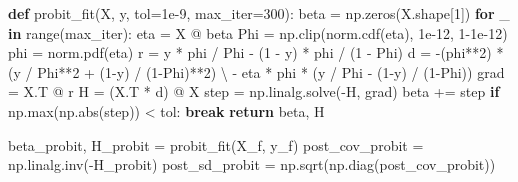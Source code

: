 \documentclass[
  letterpaper,
  DIV=11,
  numbers=noendperiod]{scrartcl}
\newenvironment{Shaded}{\begin{snugshade}}{\end{snugshade}}
\newcommand{\BuiltInTok}[1]{\textcolor[rgb]{0.00,0.23,0.31}{#1}}
\newcommand{\ControlFlowTok}[1]{\textcolor[rgb]{0.00,0.23,0.31}{\textbf{#1}}}
\newcommand{\DecValTok}[1]{\textcolor[rgb]{0.68,0.00,0.00}{#1}}
\newcommand{\FloatTok}[1]{\textcolor[rgb]{0.68,0.00,0.00}{#1}}
\newcommand{\KeywordTok}[1]{\textcolor[rgb]{0.00,0.23,0.31}{\textbf{#1}}}
\newcommand{\NormalTok}[1]{\textcolor[rgb]{0.00,0.23,0.31}{#1}}
\newcommand{\OperatorTok}[1]{\textcolor[rgb]{0.37,0.37,0.37}{#1}}
\begin{document}
\begin{Shaded}
\begin{Highlighting}[]
\KeywordTok{def}\NormalTok{ probit\_fit(X, y, tol}\OperatorTok{=}\FloatTok{1e{-}9}\NormalTok{, max\_iter}\OperatorTok{=}\DecValTok{300}\NormalTok{):}
\NormalTok{    beta }\OperatorTok{=}\NormalTok{ np.zeros(X.shape[}\DecValTok{1}\NormalTok{])}
    \ControlFlowTok{for}\NormalTok{ \_ }\KeywordTok{in} \BuiltInTok{range}\NormalTok{(max\_iter):}
\NormalTok{        eta }\OperatorTok{=}\NormalTok{ X }\OperatorTok{@}\NormalTok{ beta}
\NormalTok{        Phi }\OperatorTok{=}\NormalTok{ np.clip(norm.cdf(eta), }\FloatTok{1e{-}12}\NormalTok{, }\DecValTok{1}\OperatorTok{{-}}\FloatTok{1e{-}12}\NormalTok{)}
\NormalTok{        phi }\OperatorTok{=}\NormalTok{ norm.pdf(eta)}
\NormalTok{        r }\OperatorTok{=}\NormalTok{ y }\OperatorTok{*}\NormalTok{ phi }\OperatorTok{/}\NormalTok{ Phi }\OperatorTok{{-}}\NormalTok{ (}\DecValTok{1} \OperatorTok{{-}}\NormalTok{ y) }\OperatorTok{*}\NormalTok{ phi }\OperatorTok{/}\NormalTok{ (}\DecValTok{1} \OperatorTok{{-}}\NormalTok{ Phi)}
\NormalTok{        d }\OperatorTok{=} \OperatorTok{{-}}\NormalTok{(phi}\OperatorTok{**}\DecValTok{2}\NormalTok{) }\OperatorTok{*}\NormalTok{ (y }\OperatorTok{/}\NormalTok{ Phi}\OperatorTok{**}\DecValTok{2} \OperatorTok{+}\NormalTok{ (}\DecValTok{1}\OperatorTok{{-}}\NormalTok{y) }\OperatorTok{/}\NormalTok{ (}\DecValTok{1}\OperatorTok{{-}}\NormalTok{Phi)}\OperatorTok{**}\DecValTok{2}\NormalTok{) }\OperatorTok{\textbackslash{}}
            \OperatorTok{{-}}\NormalTok{ eta }\OperatorTok{*}\NormalTok{ phi }\OperatorTok{*}\NormalTok{ (y }\OperatorTok{/}\NormalTok{ Phi }\OperatorTok{{-}}\NormalTok{ (}\DecValTok{1}\OperatorTok{{-}}\NormalTok{y) }\OperatorTok{/}\NormalTok{ (}\DecValTok{1}\OperatorTok{{-}}\NormalTok{Phi))}
\NormalTok{        grad }\OperatorTok{=}\NormalTok{ X.T }\OperatorTok{@}\NormalTok{ r}
\NormalTok{        H }\OperatorTok{=}\NormalTok{ (X.T }\OperatorTok{*}\NormalTok{ d) }\OperatorTok{@}\NormalTok{ X}
\NormalTok{        step }\OperatorTok{=}\NormalTok{ np.linalg.solve(}\OperatorTok{{-}}\NormalTok{H, grad)}
\NormalTok{        beta }\OperatorTok{+=}\NormalTok{ step}
        \ControlFlowTok{if}\NormalTok{ np.}\BuiltInTok{max}\NormalTok{(np.}\BuiltInTok{abs}\NormalTok{(step)) }\OperatorTok{\textless{}}\NormalTok{ tol:}
            \ControlFlowTok{break}
    \ControlFlowTok{return}\NormalTok{ beta, H}

\NormalTok{beta\_probit, H\_probit }\OperatorTok{=}\NormalTok{ probit\_fit(X\_f, y\_f)}
\NormalTok{post\_cov\_probit }\OperatorTok{=}\NormalTok{ np.linalg.inv(}\OperatorTok{{-}}\NormalTok{H\_probit)}
\NormalTok{post\_sd\_probit  }\OperatorTok{=}\NormalTok{ np.sqrt(np.diag(post\_cov\_probit))}


\end{Highlighting}
\end{Shaded}
\end{document}
